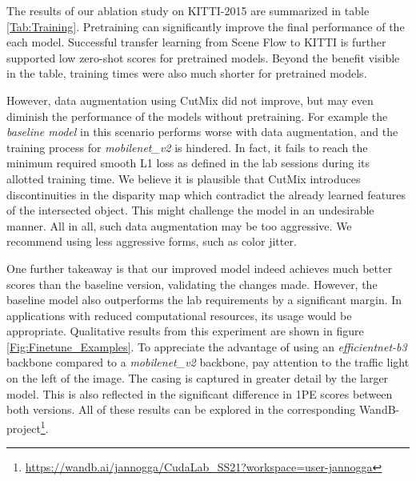 \documentclass[runningheads]{llncs}
\begin{document}
The results of our ablation study on KITTI-2015 are summarized in table \ref{Tab:Training}. Pretraining can significantly improve the final performance of the each model. Successful transfer learning from Scene Flow to KITTI is further supported low zero-shot scores for pretrained models. Beyond the benefit visible in the table, training times were also much shorter for pretrained models. 

However, data augmentation using CutMix did not improve, but may even diminish the performance of the models without pretraining. For example the \textit{baseline model} in this scenario performs worse with data augmentation, and the training process for \textit{mobilenet\_v2} is hindered. In fact, it fails to reach the minimum required smooth L1 loss as defined in the lab sessions during its allotted training time. We believe it is plausible that CutMix introduces discontinuities in the disparity map which contradict the already learned features of the intersected object. This might challenge the model in an undesirable manner. All in all, such data augmentation may be too aggressive. We recommend using less aggressive forms, such as color jitter.

One further takeaway is that our improved model indeed achieves much better scores than the baseline version, validating the changes made. However, the baseline model also outperforms the lab requirements by a significant margin. In applications with reduced computational resources, its usage would be appropriate. Qualitative results from this experiment are shown in figure \ref{Fig:Finetune_Examples}. To appreciate the advantage of using an \textit{efficientnet-b3} backbone compared to a \textit{mobilenet\_v2} backbone, pay attention to the traffic light on the left of the image. The casing is captured in greater detail by the larger model. This is also reflected in the significant difference in 1PE scores between both versions. All of these results can be explored in the corresponding WandB-project\footnote{\url{https://wandb.ai/jannogga/CudaLab_SS21?workspace=user-jannogga}}.
\end{document}
